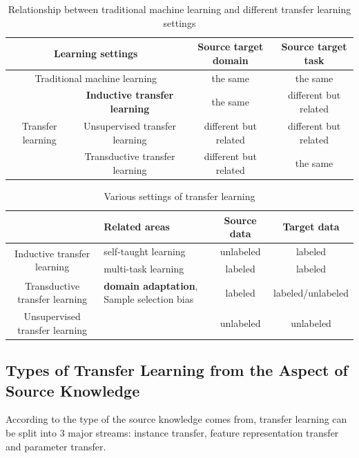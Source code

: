 \begin{table}[htbp]
	\centering
	\caption{Relationship between traditional machine learning and different transfer learning settings}
	\begin{tabular}{|c|c|c|c|}
		\hline
		\multicolumn{2}{|c|}{Learning settings} & Source target domain & Source target task \\
		\hline
		\multicolumn{2}{|c|}{Traditional machine learning} & the same & the same \\\hline
		\multirow{3}{*}{Transfer learning} & \textbf{Inductive transfer learning} & the same & different but related \\\cline{2-4}
		& Unsupervised transfer learning & different but related & different but related \\\cline{2-4}
		& Transductive transfer learning & different but related & the same \\\hline	
	\end{tabular}%
	\label{tab:related:transfercmp}%
\end{table}%

\begin{table}[htbp]
	\centering
	\caption{Various settings of transfer learning}
	\begin{tabular}{|c|C{4cm}|c|c|}
		\hline
		& Related areas & Source data & Target data \\
		\hline
		[4]{*}{Inductive transfer learning} & self-taught learning & unlabeled & labeled \\
		& multi-task learning & labeled & labeled \\\hline
		 Transductive transfer learning& \textbf{domain adaptation}, Sample selection bias & labeled & labeled/unlabeled \\\hline
		Unsupervised transfer learning &       & unlabeled & unlabeled \\
		\hline
	\end{tabular}%
	\label{tab:related:transfersetting}%
\end{table}%

\subsection{Types of Transfer Learning from the Aspect of Source Knowledge}
According to the type of the source knowledge comes from, transfer learning can be split into 3 major streams: instance transfer, feature representation transfer and parameter transfer.


